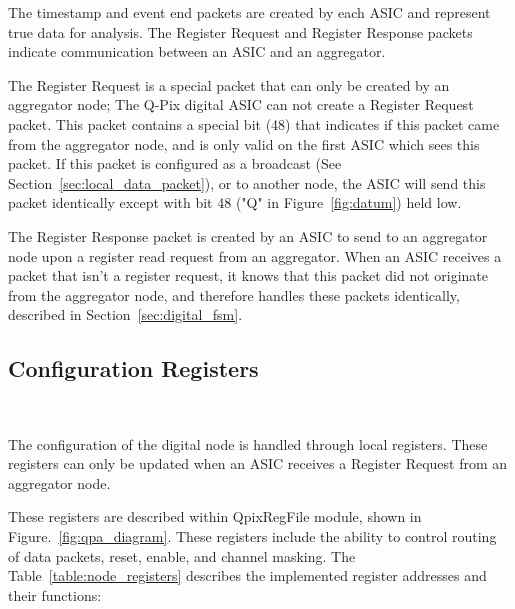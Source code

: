 The timestamp and event end packets are created by each ASIC and represent true data for analysis.
The Register Request and Register Response packets indicate communication between an ASIC and an aggregator.

The Register Request is a special packet that can only be created by an aggregator node; The Q-Pix digital ASIC can not create a Register Request packet.
This packet contains a special bit (48) that indicates if this packet came from the aggregator node, and is only valid on the first ASIC which sees this packet.
If this packet is configured as a broadcast (See Section~\ref{sec:local_data_packet}), or to another node, the ASIC will send this packet identically except with bit 48 ("Q" in Figure~\ref{fig:datum}) held low.

The Register Response packet is created by an ASIC to send to an aggregator node upon a register read request from an aggregator.
When an ASIC receives a packet that isn't a register request, it knows that this packet did not originate from the aggregator node, and therefore handles these packets identically, described in Section~\ref{sec:digital_fsm}.

\subsection{Configuration Registers}~\label{sec:registers}

The configuration of the digital node is handled through local registers.
These registers can only be updated when an ASIC receives a Register Request from an aggregator node.

These registers are described within QpixRegFile module, shown in Figure.~\ref{fig:qpa_diagram}.
These registers include the ability to control routing of data packets, reset, enable, and channel masking.
The Table~\ref{table:node_registers} describes the implemented register addresses and their functions:

